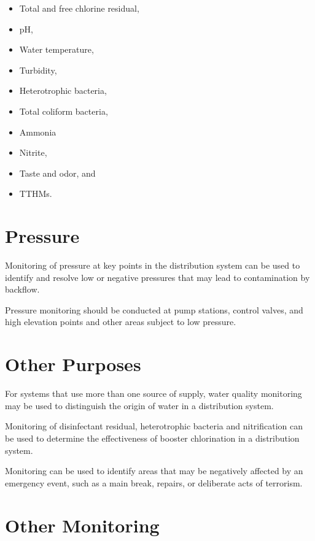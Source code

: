 \documentclass[10pt]{article}
\begin{document}
\begin{itemize}
  \item Total and free chlorine residual,

  \item $\mathrm{pH}$,

  \item Water temperature,

  \item Turbidity,

  \item Heterotrophic bacteria,

  \item Total coliform bacteria,

  \item Ammonia

  \item Nitrite,

  \item Taste and odor, and

  \item TTHMs.

\end{itemize}
\section{Pressure}
Monitoring of pressure at key points in the distribution system can be used to identify and resolve low or negative pressures that may lead to contamination by backflow.

Pressure monitoring should be conducted at pump stations, control valves, and high elevation points and other areas subject to low pressure.

\section{Other Purposes}
For systems that use more than one source of supply, water quality monitoring may be used to distinguish the origin of water in a distribution system.

Monitoring of disinfectant residual, heterotrophic bacteria and nitrification can be used to determine the effectiveness of booster chlorination in a distribution system.

Monitoring can be used to identify areas that may be negatively affected by an emergency event, such as a main break, repairs, or deliberate acts of terrorism.

\section{Other Monitoring}
\end{document}

